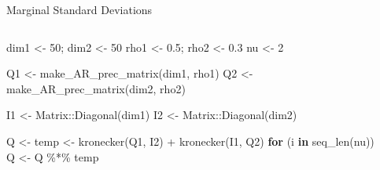 \documentclass[
  ignorenonframetext,
]{beamer}
\newenvironment{Shaded}{\begin{snugshade}}{\end{snugshade}}
\newcommand{\ControlFlowTok}[1]{\textcolor[rgb]{0.00,0.23,0.31}{\textbf{#1}}}
\newcommand{\DecValTok}[1]{\textcolor[rgb]{0.68,0.00,0.00}{#1}}
\newcommand{\FloatTok}[1]{\textcolor[rgb]{0.68,0.00,0.00}{#1}}
\newcommand{\FunctionTok}[1]{\textcolor[rgb]{0.28,0.35,0.67}{#1}}
\newcommand{\NormalTok}[1]{\textcolor[rgb]{0.00,0.23,0.31}{#1}}
\newcommand{\OtherTok}[1]{\textcolor[rgb]{0.00,0.23,0.31}{#1}}
\newcommand{\SpecialCharTok}[1]{\textcolor[rgb]{0.37,0.37,0.37}{#1}}
\begin{document}
\begin{frame}[fragile]{Marginal Standard Deviations}
\label{marginal-standard-deviations-1}
\begin{columns}[T]
\begin{column}{0.58\textwidth}
\begin{Shaded}
\begin{Highlighting}[]
\NormalTok{dim1 }\OtherTok{\textless{}{-}} \DecValTok{50}\NormalTok{; dim2 }\OtherTok{\textless{}{-}} \DecValTok{50}
\NormalTok{rho1 }\OtherTok{\textless{}{-}} \FloatTok{0.5}\NormalTok{; rho2 }\OtherTok{\textless{}{-}} \FloatTok{0.3}
\NormalTok{nu }\OtherTok{\textless{}{-}} \DecValTok{2}

\NormalTok{Q1 }\OtherTok{\textless{}{-}} \FunctionTok{make\_AR\_prec\_matrix}\NormalTok{(dim1, rho1)}
\NormalTok{Q2 }\OtherTok{\textless{}{-}} \FunctionTok{make\_AR\_prec\_matrix}\NormalTok{(dim2, rho2)}

\NormalTok{I1 }\OtherTok{\textless{}{-}}\NormalTok{ Matrix}\SpecialCharTok{::}\FunctionTok{Diagonal}\NormalTok{(dim1)}
\NormalTok{I2 }\OtherTok{\textless{}{-}}\NormalTok{ Matrix}\SpecialCharTok{::}\FunctionTok{Diagonal}\NormalTok{(dim2)}

\NormalTok{Q }\OtherTok{\textless{}{-}}\NormalTok{ temp }\OtherTok{\textless{}{-}} \FunctionTok{kronecker}\NormalTok{(Q1, I2) }\SpecialCharTok{+} \FunctionTok{kronecker}\NormalTok{(I1, Q2)}
\ControlFlowTok{for}\NormalTok{ (i }\ControlFlowTok{in} \FunctionTok{seq\_len}\NormalTok{(nu)) Q }\OtherTok{\textless{}{-}}\NormalTok{ Q }\SpecialCharTok{\%*\%}\NormalTok{ temp}
\end{Highlighting}
\end{Shaded}
\end{column}

\begin{column}{0.42\textwidth}
\begin{Shaded}
\end{Shaded}
\end{column}
\end{columns}


\end{frame}
\end{document}
